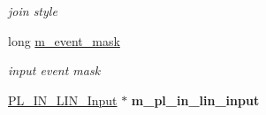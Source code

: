 \begin{DoxyCompactItemize}
\begin{DoxyCompactList}\small\item\em join style \item\end{DoxyCompactList}\item 
\hypertarget{classPlatform_1_1Window_1_1Linux_1_1Window_a5a4494824098db4f3a4131ac60b5956a}{
long \hyperlink{classPlatform_1_1Window_1_1Linux_1_1Window_a5a4494824098db4f3a4131ac60b5956a}{m\_\-event\_\-mask}}
\label{classPlatform_1_1Window_1_1Linux_1_1Window_a5a4494824098db4f3a4131ac60b5956a}

\begin{DoxyCompactList}\small\item\em input event mask \item\end{DoxyCompactList}\item 
\hypertarget{classPlatform_1_1Window_1_1Linux_1_1Window_ab146681c54fc83baf613975a57f783e9}{
\hyperlink{classPlatform_1_1Input_1_1Linux_1_1Input}{PL\_\-IN\_\-LIN\_\-Input} $\ast$ {\bfseries m\_\-pl\_\-in\_\-lin\_\-input}}
\label{classPlatform_1_1Window_1_1Linux_1_1Window_ab146681c54fc83baf613975a57f783e9}

\end{DoxyCompactItemize}
